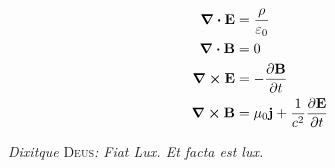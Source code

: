 \vspace*{1.5in}
{\LARGE
	\begin{align*}
		\div \vb{E} &= \frac{\rho}{\varepsilon_0} 	\\
		\div \vb{B} &= 0 \\
		\curl \vb{E} &= -\pdv{\vb{B}}{t} \\
		\curl \vb{B} &= \mu_0 \vb{j} + \frac{1}{c^2}\pdv{\vb{E}}{t} 
	\end{align*}
}
\vfill
\begin{center}
	{\large\textit{Dixitque} \textsc{Deus}\textit{: Fiat Lux. Et facta est lux.}}
\end{center}
